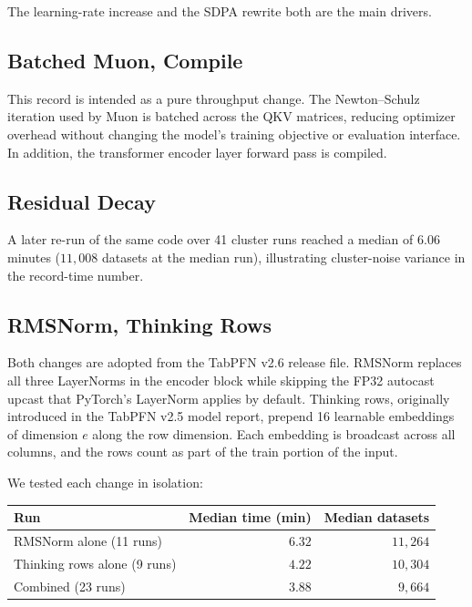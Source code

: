 \documentclass{article}
\theoremstyle{plain}
\theoremstyle{definition}
\theoremstyle{remark}
\begin{document}
The learning-rate increase and the SDPA rewrite both are the main drivers.

\subsection{Batched Muon, Compile}
\label{app:records-batched-muon}
This record is intended as a pure throughput change.
The Newton--Schulz iteration used by Muon is batched across the QKV matrices, reducing optimizer overhead without changing the model's training objective or evaluation interface.
In addition, the transformer encoder layer forward pass is compiled.

\subsection{Residual Decay}
\label{app:records-residual-decay}
A later re-run of the same code over 41 cluster runs reached a median of $6.06$ minutes ($11{,}008$ datasets at the median run), illustrating cluster-noise variance in the record-time number.

\subsection{RMSNorm, Thinking Rows}
\label{app:records-rmsthink}
Both changes are adopted from the TabPFN v2.6 release file. RMSNorm replaces all three LayerNorms in the encoder block while skipping the FP32 autocast upcast that PyTorch's LayerNorm applies by default. Thinking rows, originally introduced in the TabPFN v2.5 model report, prepend 16 learnable embeddings of dimension $e$ along the row dimension. Each embedding is broadcast across all columns, and the rows count as part of the train portion of the input.

We tested each change in isolation:

\begin{center}
\small
\begin{tabular}{@{}lrr@{}}
  \toprule
  Run & Median time (min) & Median datasets \\
  \midrule
  RMSNorm alone (11 runs)        & $6.32$ & $11{,}264$ \\
  Thinking rows alone (9 runs)   & $4.22$ & $10{,}304$ \\
  Combined (23 runs)             & $3.88$ & $\phantom{0}9{,}664$ \\
  \bottomrule
\end{tabular}
\end{center}
\end{document}
